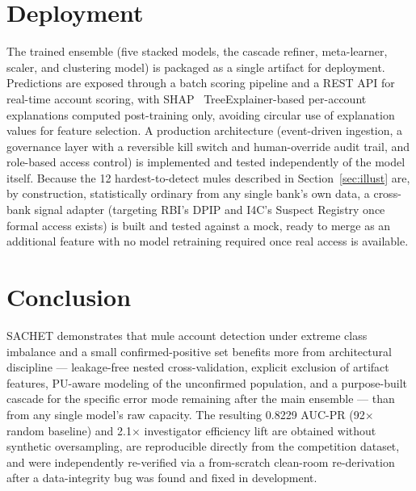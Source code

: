 \documentclass{article}
\begin{document}
\section{Deployment}
\label{sec:print}

The trained ensemble (five stacked models, the cascade refiner, meta-learner, scaler,
and clustering model) is packaged as a single artifact for deployment. Predictions are
exposed through a batch scoring pipeline and a REST API for real-time account scoring,
with SHAP~\cite{shap2017} TreeExplainer-based per-account explanations computed
post-training only, avoiding circular use of explanation values for feature selection.
A production architecture (event-driven ingestion, a governance layer with a reversible
kill switch and human-override audit trail, and role-based access control) is
implemented and tested independently of the model itself. Because the 12
hardest-to-detect mules described in Section~\ref{sec:illust} are, by construction,
statistically ordinary from any single bank's own data, a cross-bank signal adapter
(targeting RBI's DPIP and I4C's Suspect Registry once formal access exists) is built and
tested against a mock, ready to merge as an additional feature with no model retraining
required once real access is available.

\section{Conclusion}
\label{sec:refs}

SACHET demonstrates that mule account detection under extreme class imbalance and a
small confirmed-positive set benefits more from architectural discipline --- leakage-free
nested cross-validation, explicit exclusion of artifact features, PU-aware modeling
of the unconfirmed population, and a purpose-built cascade for the specific error mode
remaining after the main ensemble --- than from any single model's raw capacity. The
resulting 0.8229 AUC-PR (92$\times$ random baseline) and 2.1$\times$ investigator
efficiency lift are obtained without synthetic oversampling, are reproducible directly
from the competition dataset, and were independently re-verified via a from-scratch
clean-room re-derivation after a data-integrity bug was found and fixed in development.
\end{document}

